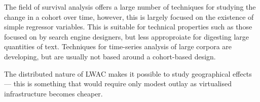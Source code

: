 The field of survival analysis offers a large number of techniques for studying the change in a cohort over time, however, this is largely focused on the existence of simple regressor variables.  This is suitable for technical properties such as those focused on by search engine designers, but less approproiate for digesting large quantities of text.  Techniques for time-series analysis of large corpora are developing, but are usually not based around a cohort-based design.

The distributed nature of LWAC makes it possible to study geographical effects --- this is something that would require only modest outlay as virtualised infrastructure becomes cheaper.


